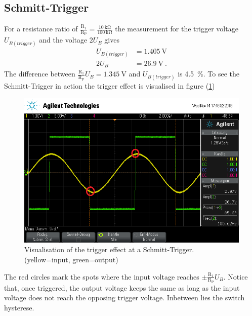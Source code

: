 \subsection{Schmitt-Trigger}
For a resistance ratio of $\frac{\text{R}_\text{1}}{\text{R}_\text{P}} = \frac{\SI{10}{\kilo\ohm}}{\SI{100}{\kilo\ohm}}$ the measurement
for the trigger voltage $U_{B(trigger)}$ and the voltage $2U_B$ gives
\begin{align*}
U_{B(trigger)} &= \SI{1.405}{\volt} \\
2U_B &= \SI{26.9}{\volt} \ .
\end{align*}
The difference between $\frac{\text{R}_\text{1}}{\text{R}_\text{P}}U_B = \SI{1.345}{\volt}$ and $U_{B(trigger)}$ is \SI{4.5}{\percent}.
To see the Schmitt-Trigger in action the trigger effect is visualised in figure (\ref{fig:trig})
\begin{figure}[H]
  \centering
  \includegraphics[scale=.9]{V51Bilder/schmitt.png}
  \caption{Visualisation of the trigger effect at a Schmitt-Trigger. (yellow=input, green=output)} \label{fig:trig}
\end{figure}
\noindent
The red circles mark the spots where the input voltage reaches $\pm \frac{\text{R}_\text{1}}{\text{R}_\text{P}}U_B$. Notice
that, once triggered, the output voltage keeps the same as long as the input voltage does not reach the opposing trigger voltage.
Inbetween lies the switch hysterese.
